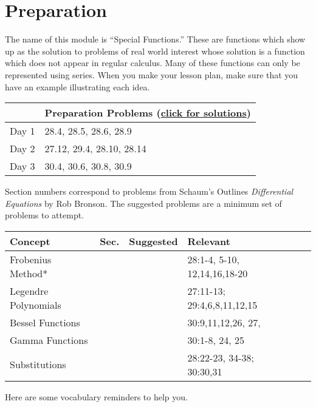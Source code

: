 

\section{Preparation}

\noindent The name of this module is ``Special Functions.'' These are functions which show up as the solution to problems of real world interest whose solution is a function which does not appear in regular calculus.  Many of these functions can only be represented using series. 
When you make your lesson plan, make sure that you have an example illustrating each idea.




\begin{center}
\begin{tabular}{ll}
&Preparation Problems
(\href{https://ilearn.byui.edu/bbcswebdav/institution/Physical\_Sci\_Eng/Mathematics/Personal\%20Folders/WoodruffB/316/09-Special-Functions-Preparation-Solutions.pdf}{click for solutions})
\\
\hline\hline
Day 1&28.4, 28.5, 28.6, 28.9\\ \hline
Day 2&27.12, 29.4, 28.10, 28.14\\ \hline
Day 3&30.4, 30.6, 30.8, 30.9\\ \hline
\end{tabular}
\end{center}


Section numbers correspond to problems from Schaum's Outlines \textit{Differential Equations} by Rob Bronson. The suggested problems are a minimum set of problems to attempt. 


\begin{center}
\begin{tabular}{|l|c|l|l|l|l|}
\hline
Concept	&Sec.	&Suggested	&Relevant\\\hline
Frobenius Method*&&&28:1-4, 5-10, 12,14,16,18-20\\ \hline
Legendre Polynomials&&&27:11-13; 29:4,6,8,11,12,15 \\ \hline
Bessel Functions&&&30:9,11,12,26, 27,\\ \hline
Gamma Functions&&& 30:1-8, 24, 25\\ \hline
Substitutions&&&28:22-23, 34-38; 30:30,31 \\ \hline
\end{tabular}
\end{center}

Here are some vocabulary reminders to help you.

